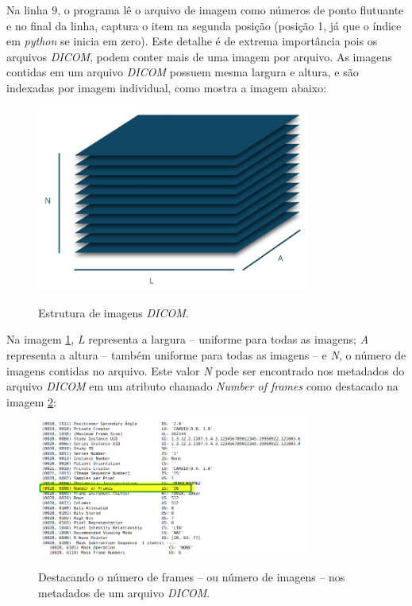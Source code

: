 Na linha 9, o programa lê o arquivo de imagem como números de ponto flutuante e no final da linha, captura o item na segunda posição (posição 1, já que o índice em \textit{python} se inicia em zero). Este detalhe é de extrema importância pois os arquivos \textit{DICOM}, podem conter mais de uma imagem por arquivo. As imagens contidas em um arquivo \textit{DICOM} possuem mesma largura e altura, e são indexadas por imagem individual, como mostra a imagem abaixo:

\begin{figure}[H]
    \centering
    \caption{Estrutura de imagens \textit{DICOM}.}
    \includegraphics[width=9cm]{fig/dicom_img.png}
    \label{fig:fig19}
\end{figure}

Na imagem \ref{fig:fig19}, \textit{L} representa a largura -- uniforme para todas as imagens; \textit{A} representa a altura -- também uniforme para todas as imagens -- e \textit{N}, o número de imagens contidas no arquivo. Este valor \textit{N} pode ser encontrado nos metadados do arquivo \textit{DICOM} em um atributo chamado \textit{Number of frames} como destacado na imagem \ref{fig:fig20}:

\begin{figure}[H]
    \centering
    \caption{Destacando o número de frames -- ou número de imagens -- nos metadados de um arquivo \textit{DICOM}.}
    \includegraphics[width=9cm]{fig/number_of_frames.png}
    \label{fig:fig20}
\end{figure}

